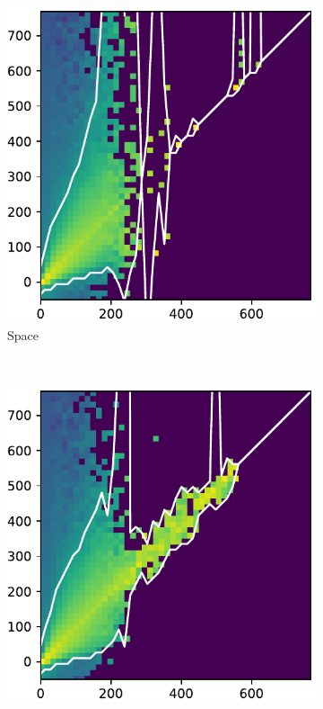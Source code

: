 \documentclass[10pt,letterpaper]{article}
\begin{document}
\begin{figure}[t!]
\begin{subfigure}[t]{0.288\textwidth}
				\includegraphics[width=\textwidth]{fig/hist_1}
					\caption{Space}
				\end{subfigure}
				~ 
				\begin{subfigure}[t]{0.288\textwidth}
					\centering
					\includegraphics[width=\textwidth]{fig/hist_2}

\end{subfigure}
\end{figure}
\end{document}
